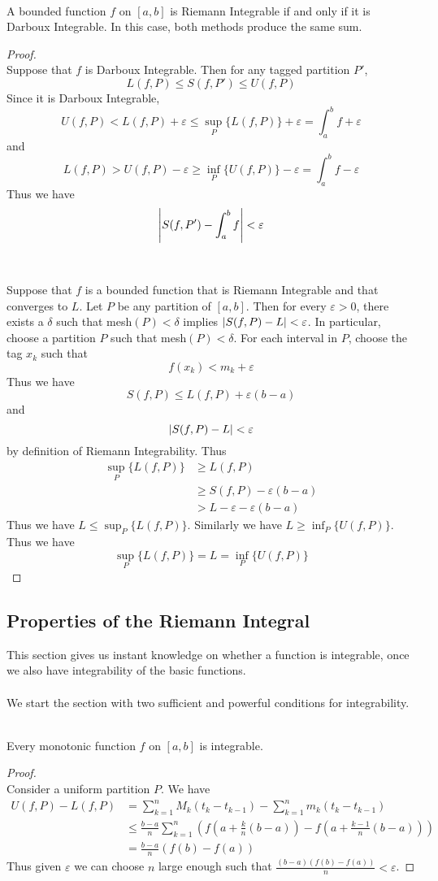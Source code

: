 \documentclass[a4paper]{article}
\begin{document}
\begin{thm}{}{}\\ A bounded function $f$ on $[a,b]$ is Riemann Integrable if and only if it is Darboux Integrable. In this case, both methods produce the same sum. 
\begin{proof}\\ Suppose that $f$ is Darboux Integrable. Then for any tagged partition $P'$, $$L(f,P)\leq S(f,P')\leq U(f,P)$$ Since it is Darboux Integrable, $$U(f,P)<L(f,P)+\varepsilon\leq\sup_P\{L(f,P)\}+\varepsilon=\int_a^b f+\varepsilon$$ and $$L(f,P)>U(f,P)-\varepsilon\geq\inf_P\{U(f,P)\}-\varepsilon=\int_a^b f-\varepsilon$$ Thus we have $$\abs{S(f,P')-\int_a^b f}<\varepsilon$$ \\~\\
Suppose that $f$ is a bounded function that is Riemann Integrable and that converges to $L$. Let $P$ be any partition of $[a,b]$. Then for every $\varepsilon>0$, there exists a $\delta$ such that mesh$(P)<\delta$ implies $\abs{S(f,P)-L}<\varepsilon$. In particular, choose a partition $P$ such that mesh$(P)<\delta$. For each interval in $P$, choose the tag $x_k$ such that $$f(x_k)<m_k+\varepsilon$$ Thus we have $$S(f,P)\leq L(f,P)+\varepsilon(b-a)$$ and $$\abs{S(f,P)-L}<\varepsilon$$ by definition of Riemann Integrability. Thus 
\begin{align*}
\sup_P\{L(f,P)\}&\geq L(f,P)\\
&\geq S(f,P)-\varepsilon(b-a)\\
&>L-\varepsilon-\varepsilon(b-a)
\end{align*}
Thus we have $L\leq\sup_P\{L(f,P)\}$. Similarly we have $L\geq\inf_P\{U(f,P)\}$. Thus we have $$\sup_P\{L(f,P)\}=L=\inf_P\{U(f,P)\}$$
\end{proof}
\end{thm}

\subsection{Properties of the Riemann Integral}
This section gives us instant knowledge on whether a function is integrable, once we also have integrability of the basic functions. \\~\\
We start the section with two sufficient and powerful conditions for integrability. 
\begin{thm}{}{}\\ Every monotonic function $f$ on $[a,b]$ is integrable. 
\begin{proof}\\ Consider a uniform partition $P$. We have 
\begin{align*}
U(f,P)-L(f,P)&=\sum_{k=1}^nM_k(t_k-t_{k-1})-\sum_{k=1}^nm_k(t_k-t_{k-1})\\
&\leq\frac{b-a}{n}\sum_{k=1}^n\left(f\left(a+\frac{k}{n}(b-a)\right)-f\left(a+\frac{k-1}{n}(b-a)\right)\right)\\
&=\frac{b-a}{n}(f(b)-f(a))
\end{align*}
Thus given $\varepsilon$ we can choose $n$ large enough such that $\frac{(b-a)(f(b)-f(a))}{n}<\varepsilon$. 
\end{proof}
\end{thm}
\end{document}
